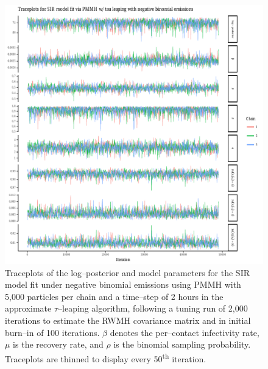 \begin{figure}[htbp]
	\centering
	\includegraphics[width=\linewidth]{figures/bbs_sir_pmmh_negbinom_traceplots.pdf}
	\caption[Traceplots of SIR model parameters fit to boarding school data using PMMH.]{Traceplots of the log--posterior and model parameters for the SIR model fit under negative binomial emissions using PMMH with 5,000 particles per chain and a time--step of 2 hours in the approximate $ \tau $--leaping algorithm, following a tuning run of 2,000 iterations to estimate the RWMH covariance matrix and in initial burn--in of 100 iterations. $ \beta $ denotes the per--contact infectivity rate, $ \mu $ is the recovery rate, and $ \rho $ is the binomial sampling probability. Traceplots are thinned to display every 50\textsuperscript{th} iteration.}
	\label{fig:bbs_sir_pmmh_negbinom_traceplots}
\end{figure}

